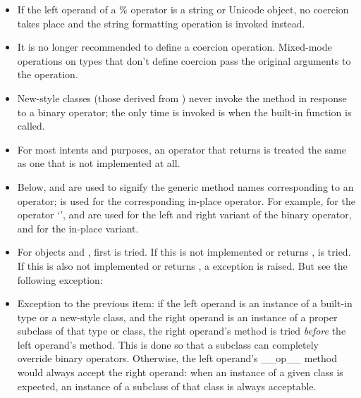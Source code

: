 \begin{itemize}

\item

If the left operand of a \% operator is a string or Unicode object, no
coercion takes place and the string formatting operation is invoked
instead.

\item

It is no longer recommended to define a coercion operation.
Mixed-mode operations on types that don't define coercion pass the
original arguments to the operation.

\item

New-style classes (those derived from ) never invoke the
 method in response to a binary operator; the only
time  is invoked is when the built-in function
 is called.

\item

For most intents and purposes, an operator that returns
 is treated the same as one that is not
implemented at all.

\item

Below,  and  are used to signify
the generic method names corresponding to an operator;
 is used for the corresponding in-place operator.  For
example, for the operator `\code{+}',  and
 are used for the left and right variant of the
binary operator, and  for the in-place variant.

\item

For objects  and , first 
is tried.  If this is not implemented or returns ,
 is tried.  If this is also not
implemented or returns , a 
exception is raised.  But see the following exception:

\item

Exception to the previous item: if the left operand is an instance of
a built-in type or a new-style class, and the right operand is an
instance of a proper subclass of that type or class, the right
operand's  method is tried \emph{before} the left
operand's  method.  This is done so that a subclass can
completely override binary operators.  Otherwise, the left operand's
__op__ method would always accept the right operand: when an instance
of a given class is expected, an instance of a subclass of that class
is always acceptable.


\end{itemize}
